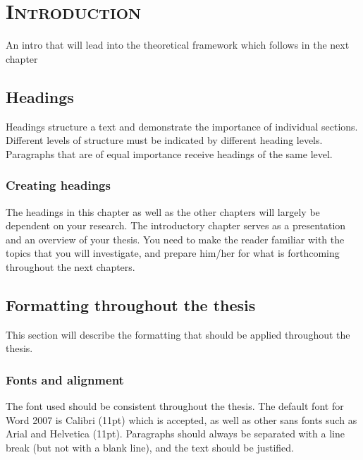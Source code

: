 %
%
% 
% 
% 

\chapter{\textsc{Introduction}}
\label{chap:intro}

An intro that will lead into the theoretical framework which follows in the next chapter

\section{Headings}
\label{sec:heading}

Headings structure a text and demonstrate the importance of individual sections. Different levels of structure must be indicated by different heading levels. 
Paragraphs that are of equal importance receive headings of the same level.

\subsection{Creating headings}
\label{sec:createheadings}

The headings in this chapter as well as the other chapters will largely be dependent on your research. The introductory chapter serves as a presentation and an overview of your thesis. You need to make the reader familiar with the topics that you will investigate, and prepare him/her for what is forthcoming throughout the next chapters. 

\section{Formatting throughout the thesis}
This section will describe the formatting that should be applied throughout the thesis.

\subsection{Fonts and alignment}
\label{sec:fonts}
The font used should be consistent throughout the thesis. The default font for Word 2007 is Calibri (11pt) which is accepted, 
as well as other sans fonts such as Arial and Helvetica (11pt). 
Paragraphs should always be separated with a line break (but not with a blank line), and the text should be justified. 

